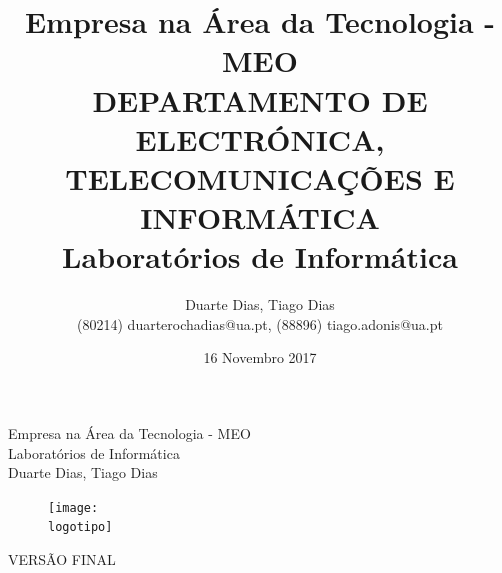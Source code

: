 \documentclass{report}
\begin{document}
%
\def\titulo{Empresa na Área da Tecnologia - MEO}
\def\autores{Duarte Dias, Tiago Dias}
\def\autorescontactos{(80214) duarterochadias@ua.pt, (88896) tiago.adonis@ua.pt}
\def\data{16 Novembro 2017}
\def\versao{VERSÃO FINAL}
\def\empresa{Laboratórios de Informática}
\def\departamento{DEPARTAMENTO DE ELECTRÓNICA, TELECOMUNICAÇÕES E INFORMÁTICA}
\def\logotipo{ua.pdf}
%
%
\begin{titlepage}

\begin{center}
%
\vspace*{50mm}
%
{\Huge \titulo}\\ 
%
\vspace{10mm}
%
{\Large \empresa}\\
%
\vspace{10mm}
%
{\LARGE \autores}\\ 
%
\vspace{30mm}
%
\begin{figure}[h]
\center
\texttt{[image: \\logotipo]}
\end{figure}
%
\vspace{30mm}
\end{center}
%
\begin{flushright}
\versao
\end{flushright}
\end{titlepage}

\title{%
{\Huge\textbf{\titulo}}\\
{\Large \departamento\\ \empresa}
}
%
\author{%
    \autores \\
    \autorescontactos
}
%
\date{\data}
%
\maketitle

\end{document}
